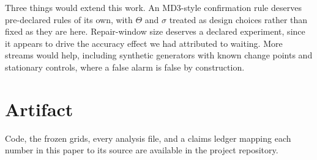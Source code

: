\documentclass[conference]{IEEEtran}
\begin{document}
Three things would extend this work. An MD3-style confirmation rule deserves
pre-declared rules of its own, with $\Theta$ and $\sigma$ treated as design
choices rather than fixed as they are here. Repair-window size deserves a
declared experiment, since it appears to drive the accuracy effect we had
attributed to waiting. More streams would help, including synthetic generators
with known change points and stationary controls, where a false alarm is false by
construction.

\section*{Artifact}

Code, the frozen grids, every analysis file, and a claims ledger mapping each
number in this paper to its source are available in the project repository.



\end{document}
